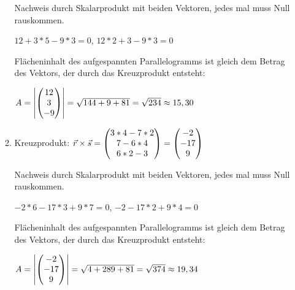 \begin{lsg}{}
\begin{enumerate}
\begin{enumerate}
			Nachweis durch Skalarprodukt mit beiden Vektoren, jedes mal muss Null rauskommen.

			$12+3*5-9*3=0$, $12*2+3-9*3=0$

			Flächeninhalt des aufgespannten Parallelogramms ist gleich dem Betrag des Vektors, der durch das Kreuzprodukt entsteht:

			$A=\left|\begin{pmatrix} 12\\3\\-9 \end{pmatrix}\right|=\sqrt{144+9+81}=\sqrt{234}\approx 15,30$
			\item Kreuzprodukt: $\vec r\times \vec s=\begin{pmatrix} 3*4-7*2\\7-6*4\\6*2-3 \end{pmatrix}=\begin{pmatrix} -2\\-17\\9 \end{pmatrix}$

			Nachweis durch Skalarprodukt mit beiden Vektoren, jedes mal muss Null rauskommen.

			$-2*6-17*3+9*7=0$, $-2-17*2+9*4=0$

			Flächeninhalt des aufgespannten Parallelogramms ist gleich dem Betrag des Vektors, der durch das Kreuzprodukt entsteht:

			$A=\left|\begin{pmatrix} -2\\-17\\9 \end{pmatrix}\right|=\sqrt{4+289+81}=\sqrt{374}\approx 19,34$
		\end{enumerate}
	\end{enumerate}
\end{lsg}





